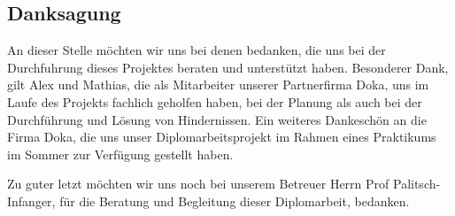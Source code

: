 \begin{spacing}{.5}
    \chapter*{Danksagung}
  \end{spacing}
An dieser Stelle möchten wir uns bei denen bedanken, die uns bei der Durchfuhrung dieses Projektes 
beraten und unterstützt haben.
Besonderer Dank, gilt Alex und Mathias, die als Mitarbeiter unserer Partnerfirma Doka, uns im Laufe 
des Projekts fachlich geholfen haben, bei der Planung als auch bei der Durchführung und Lösung von Hindernissen.
Ein weiteres Dankeschön an die Firma Doka, die uns unser Diplomarbeitsprojekt im Rahmen eines 
Praktikums im Sommer zur Verfügung gestellt haben.

Zu guter letzt möchten wir uns noch bei unserem Betreuer Herrn Prof Palitsch-Infanger, 
für die Beratung und Begleitung dieser Diplomarbeit, bedanken.


